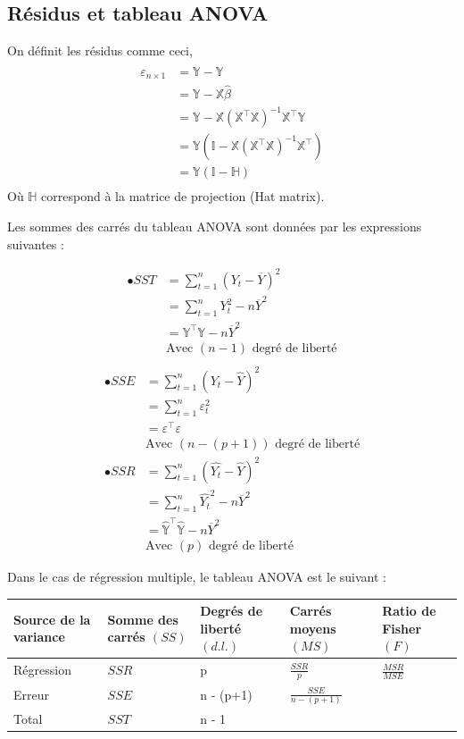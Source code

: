 \documentclass[11pt,french]{report}
\begin{document}
\subsection{Résidus et tableau ANOVA}
On définit les résidus comme ceci,
\begin{align*}
\varepsilon_{n \times 1} &= \mathbb{Y} - \hat{\mathbb{Y}} \\
&= \mathbb{Y} - \mathbb{X} \hat{\beta} \\
&= \mathbb{Y} - \mathbb{X}(\mathbb{X}^\intercal\mathbb{X})^{-1}\mathbb{X}^\intercal\mathbb{Y} \\
&= \mathbb{Y} (\mathbb{I} - \mathbb{X}(\mathbb{X}^\intercal\mathbb{X})^{-1}\mathbb{X}^\intercal) \\
&= \mathbb{Y} (\mathbb{I} - \mathbb{H}) \\
\end{align*}
Où $\mathbb{H}$ correspond à la matrice de projection (Hat matrix).\newline

Les sommes des carrés du tableau ANOVA sont données par les expressions suivantes :

\begin{align*}
\bullet SST &= \sum_{t=1}^n(Y_t - \overline{Y})^2 \\
&= \sum_{t=1}^nY_t^2 - n\overline{Y}^2 \\
&= \mathbb{Y}^\intercal\mathbb{Y} - n \overline{Y}^2 \\
& \text{Avec $(n-1)$ degré de liberté} \\
\end{align*}
\begin{align*}
\bullet SSE &= \sum_{t=1}^n(Y_t - \hat{Y})^2 \\
&= \sum_{t=1}^n\varepsilon_t^2 \\
&= \mathbb{\varepsilon}^\intercal\mathbb{\varepsilon}\\
& \text{Avec $(n-(p+1))$ degré de liberté} \\
\bullet SSR &= \sum_{t=1}^n(\hat{Y_t} - \hat{Y})^2 \\
&= \sum_{t=1}^n\hat{Y_t}^2 - n\overline{Y}^2 \\
&= \mathbb{\hat{Y}}^\intercal\mathbb{\hat{Y}} - n \overline{Y}^2\\
& \text{Avec $(p)$ degré de liberté}
\end{align*}

\bigskip
Dans le cas de régression multiple, le tableau ANOVA est le suivant :

\bigskip
\begin{tabularx}{\linewidth}{|X|X|X|X|X|}
\hline
Source de la variance & Somme des carrés $(SS)$ & Degrés de liberté $(d.l.)$ & Carrés moyens $(MS)$ & Ratio de Fisher $(F)$ \\
\hline
Régression & $SSR$ & p & $\frac{SSR}{p}$ & $\frac{MSR}{MSE}$ \\
Erreur & $SSE$ & n - (p+1) & $ \frac{SSE}{n-(p+1)}$ & \\
\hline
Total & $SST$ & n - 1 & & \\
\hline
\end{tabularx}
\end{document}
